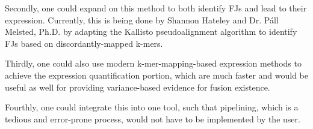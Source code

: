 Secondly, one could expand on this method to both identify FJs and lead to their expression. Currently, this is being done by Shannon Hateley and Dr. P\'{a}ll Melsted, Ph.D. by adapting the Kallisto pseudoalignment algorithm\cite{bray_near-optimal_2016} to identify FJs based on discordantly-mapped k-mers.

Thirdly, one could also use modern k-mer-mapping-based expression methods to achieve the expression quantification portion, which are much faster and would be useful as well for providing variance-based evidence for fusion existence.

Fourthly, one could integrate this into one tool, such that pipelining, which is a tedious and error-prone process, would not have to be implemented by the user.









